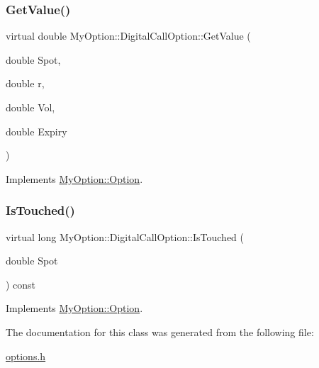 \subsubsection{\texorpdfstring{Get\+Value()}{GetValue()}\hspace{0.1cm}{\footnotesize\ttfamily [3/3]}}
{\footnotesize\ttfamily virtual double My\+Option\+::\+Digital\+Call\+Option\+::\+Get\+Value (\begin{DoxyParamCaption}\item[{double}]{Spot,  }\item[{double}]{r,  }\item[{double}]{Vol,  }\item[{double}]{Expiry }\end{DoxyParamCaption})\hspace{0.3cm}{\ttfamily [virtual]}}



Implements \hyperlink{classMyOption_1_1Option_a62422d3dc60eabe65cfa94d2a452f5f8}{My\+Option\+::\+Option}.

\hypertarget{classMyOption_1_1DigitalCallOption_a121b168de89ae10c90d2e11036588b29}{}\label{classMyOption_1_1DigitalCallOption_a121b168de89ae10c90d2e11036588b29} 
\subsubsection{\texorpdfstring{Is\+Touched()}{IsTouched()}}
{\footnotesize\ttfamily virtual long My\+Option\+::\+Digital\+Call\+Option\+::\+Is\+Touched (\begin{DoxyParamCaption}\item[{double}]{Spot }\end{DoxyParamCaption}) const\hspace{0.3cm}{\ttfamily [virtual]}}



Implements \hyperlink{classMyOption_1_1Option_ade57d2fcb9f22f3c2a57d75f55444c33}{My\+Option\+::\+Option}.



The documentation for this class was generated from the following file\+:\begin{DoxyCompactItemize}
\item 
\hyperlink{options_8h}{options.\+h}\end{DoxyCompactItemize}
